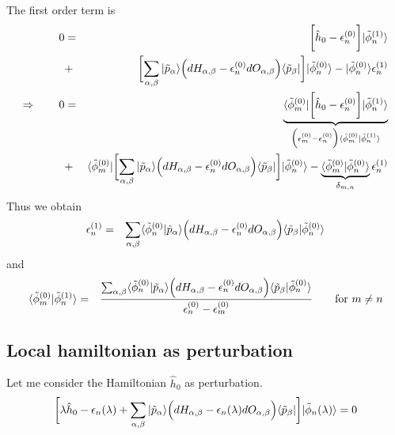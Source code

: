 \documentclass[11pt,a4paper]{report}
\begin{document}
The first order term is
\begin{eqnarray}
0&=&
\biggl[\hat{h}_0-\epsilon_n^{(0)}\biggr]|\tilde{\phi}_n^{(1)}\rangle
\nonumber\\
&+&
\biggl[\sum_{\alpha,\beta}|\tilde{p}_\alpha\rangle
\Bigl(dH_{\alpha,\beta}-\epsilon_n^{(0)} dO_{\alpha,\beta}\Bigr)
\langle\tilde{p}_\beta|\biggr]|\tilde{\phi}_n^{(0)}\rangle
-|\tilde{\phi}_n^{(0)}\rangle
\epsilon_n^{(1)}
\nonumber\\
\Rightarrow\qquad
0&=&
\underbrace{
\langle\tilde{\phi}_m^{(0)}|
\biggl[\hat{h}_0-\epsilon_n^{(0)}\biggr]|\tilde{\phi}_n^{(1)}\rangle
}_{\Bigl(\epsilon_m^{(0)}-\epsilon_n^{(0)}\Bigr)
\langle\tilde{\phi}_m^{(0)}|\tilde{\phi}_n^{(1)}\rangle}
\nonumber\\
&+&
\langle\tilde{\phi}_m^{(0)}|\biggl[\sum_{\alpha,\beta}|\tilde{p}_\alpha\rangle
\Bigl(dH_{\alpha,\beta}-\epsilon_n^{(0)} dO_{\alpha,\beta}\Bigr)
\langle\tilde{p}_\beta|\biggr]|\tilde{\phi}_n^{(0)}\rangle
-\underbrace{\langle\tilde{\phi}_m^{(0)}|\tilde{\phi}_n^{(0)}\rangle
}_{\delta_{m,n}}
\epsilon_n^{(1)}
\end{eqnarray}
Thus we obtain
\begin{eqnarray}
\epsilon_n^{(1)}&=&
\sum_{\alpha,\beta}\langle\tilde{\phi}_n^{(0)}|\tilde{p}_\alpha\rangle
\Bigl(dH_{\alpha,\beta}-\epsilon_n^{(0)} dO_{\alpha,\beta}\Bigr)
\langle\tilde{p}_\beta|\tilde{\phi}_n^{(0)}\rangle
\end{eqnarray}
and
\begin{eqnarray}
\langle\tilde{\phi}_m^{(0)}|\tilde{\phi}_n^{(1)}\rangle
&=&\frac{\sum_{\alpha,\beta}
\langle\tilde{\phi}_n^{(0)}|\tilde{p}_\alpha\rangle
\Bigl(dH_{\alpha,\beta}-\epsilon_n^{(0)} dO_{\alpha,\beta}\Bigr)
\langle\tilde{p}_\beta|\tilde{\phi}_n^{(0)}\rangle}
{\epsilon_n^{(0)}-\epsilon_m^{(0)}}
\qquad\text{for $m\neq n$}
\end{eqnarray}

\subsection{Local hamiltonian as perturbation}
Let me consider the Hamiltonian $\hat{h}_0$ as perturbation.
\begin{eqnarray}
\biggl[\lambda \hat{h}_0-\epsilon_n(\lambda)
+\sum_{\alpha,\beta}|\tilde{p}_\alpha\rangle
\Bigl(dH_{\alpha,\beta}-\epsilon_n(\lambda) dO_{\alpha,\beta}\Bigr)
\langle\tilde{p}_\beta|\biggr]|\tilde{\phi}_n(\lambda)\rangle=0
\end{eqnarray}
\end{document}
